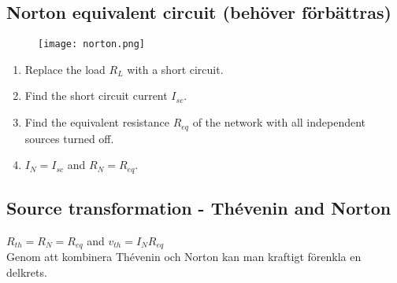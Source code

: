 \subsection{Norton equivalent circuit (behöver förbättras)}

\begin{figure}[H]
    \centering
        \texttt{[image: norton.png]}
    \label{fig:norton}
\end{figure}

\begin{enumerate}
    \item Replace the load \(R_L\) with a short circuit.
    \item Find the short circuit current \(I_{sc}\).
    \item Find the equivalent resistance \(R_{eq}\) of the network with all independent sources turned off.
    \item \(I_N = I_{sc}\) and \(R_N = R_{eq}\).
\end{enumerate}

\subsection{Source transformation - Thévenin and Norton}
\(R_{th} = R_N = R_{eq}\) and \(v_{th} = I_NR_{eq}\)
\\
Genom att kombinera Thévenin och Norton kan man kraftigt förenkla en delkrets.
